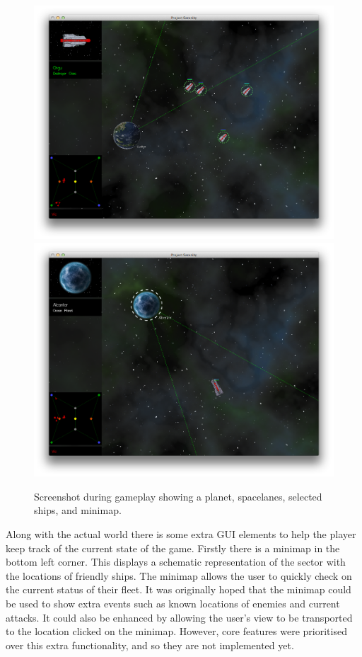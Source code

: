 \begin{figure}[p]
	\includegraphics[width=15.5cm]{res/serenityscreens/09-ingame1}
	\includegraphics[width=15.5cm]{res/serenityscreens/10-ingame2}
	\caption{Screenshot during gameplay showing a planet, spacelanes, selected ships, and minimap.}
	\label{fig:gameplay}
\end{figure}

Along with the actual world there is some extra GUI elements to help the player keep track of the current state of the game. Firstly there is a minimap in the bottom left corner. This displays a schematic representation of the sector with the locations of friendly ships. The minimap allows the user to quickly check on the current status of their fleet. It was originally hoped that the minimap could be used to show extra events such as known locations of enemies and current attacks. It could also be enhanced by allowing the user's view to be transported to the location clicked on the minimap. However, core features were prioritised over this extra functionality, and so they are not implemented yet.

